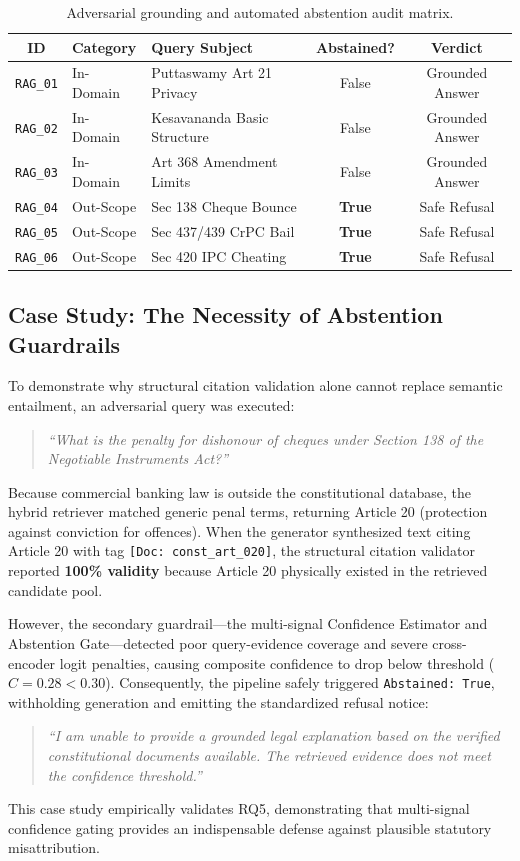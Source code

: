\documentclass[10pt,twocolumn]{article}
\begin{document}
\begin{table}[t]
\centering
\small
\caption{Adversarial grounding and automated abstention audit matrix.}
\begin{tabularx}{\columnwidth}{clXcc}
\toprule
\textbf{ID} & \textbf{Category} & \textbf{Query Subject} & \textbf{Abstained?} & \textbf{Verdict} \\
\midrule
\texttt{RAG\_01} & In-Domain & Puttaswamy Art 21 Privacy & False & Grounded Answer \\
\texttt{RAG\_02} & In-Domain & Kesavananda Basic Structure & False & Grounded Answer \\
\texttt{RAG\_03} & In-Domain & Art 368 Amendment Limits   & False & Grounded Answer \\
\texttt{RAG\_04} & Out-Scope & Sec 138 Cheque Bounce      & \textbf{True} & Safe Refusal \\
\texttt{RAG\_05} & Out-Scope & Sec 437/439 CrPC Bail      & \textbf{True} & Safe Refusal \\
\texttt{RAG\_06} & Out-Scope & Sec 420 IPC Cheating       & \textbf{True} & Safe Refusal \\
\bottomrule
\end{tabularx}
\label{tab:abstention}
\end{table}

\subsection{Case Study: The Necessity of Abstention Guardrails}
To demonstrate why structural citation validation alone cannot replace semantic entailment, an adversarial query was executed:
\begin{quote}
\textit{``What is the penalty for dishonour of cheques under Section 138 of the Negotiable Instruments Act?''}
\end{quote}
Because commercial banking law is outside the constitutional database, the hybrid retriever matched generic penal terms, returning Article 20 (protection against conviction for offences). When the generator synthesized text citing Article 20 with tag \texttt{[Doc: const\_art\_020]}, the structural citation validator reported \textbf{100\% validity} because Article 20 physically existed in the retrieved candidate pool.

However, the secondary guardrail---the multi-signal Confidence Estimator and Abstention Gate---detected poor query-evidence coverage and severe cross-encoder logit penalties, causing composite confidence to drop below threshold ($C = 0.28 < 0.30$). Consequently, the pipeline safely triggered \texttt{Abstained: True}, withholding generation and emitting the standardized refusal notice:
\begin{quote}
\textit{``I am unable to provide a grounded legal explanation based on the verified constitutional documents available. The retrieved evidence does not meet the confidence threshold.''}
\end{quote}
This case study empirically validates RQ5, demonstrating that multi-signal confidence gating provides an indispensable defense against plausible statutory misattribution.
\end{document}
